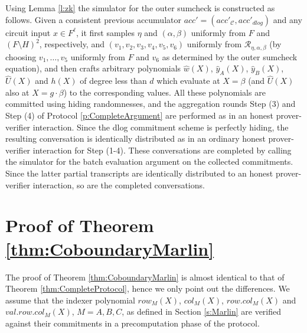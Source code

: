 \documentclass[10pt,article,oneside]{memoir}
\newtheorem{thm}{Theorem}[]
\theoremstyle{definition}
\theoremstyle{remark}
\begin{document}
\medskip
Using Lemma \ref{l:zk} the simulator for the outer sumcheck is constructed as follows.
Given a consistent previous accumulator $acc'=(acc'_{\mathcal C}, acc'_{dlog})$ and any circuit input $x\in F^\ell$, it first samples $\eta$ and $(\alpha,\beta)$ uniformly from $F$ and $(F\setminus H)^2$, respectively, and $(v_1, v_2, v_3,v_4,v_5,v_6)$ uniformly from $\mathcal R_{\eta,\alpha,\beta}$ (by choosing $v_1,\ldots, v_5$ uniformly from $F$ and $v_6$ as determined by the outer sumcheck equation), and then crafts arbitrary polynomials $\hat w(X)$, $\hat y_A(X)$, $\hat y_B(X)$, $\hat U(X)$ and $h(X)$ of degree less than $d$ which evaluate at $X=\beta$ (and $\hat U(X)$ also at $X=g\cdot\beta$) to the corresponding values.
All these polynomials are committed using hiding randomnesses, and the aggregation rounds Step (3) and Step (4) of Protocol \ref{p:CompleteArgument} are performed as in an honest prover-verifier interaction. 
Since the dlog commitment scheme is perfectly hiding, the resulting conversation is identically distributed as in an ordinary honest prover-verifier interaction for Step (1-4).
These conversations are completed by calling the simulator for the batch evaluation argument on the collected commitments.
Since the latter partial transcripts are identically distributed to an honest prover-verifier interaction, so are the completed conversations. 



\section{Proof of Theorem \ref{thm:CoboundaryMarlin}}
\label{s:ProofCoboundaryMarlin}

The proof of Theorem \ref{thm:CoboundaryMarlin} is almost identical to that of Theorem \ref{thm:CompleteProtocol}, hence we only point out the differences. 
We assume that the indexer polynomial $row_M(X)$, $col_M(X)$, $row.col_M(X)$ and $val.row.col_M(X)$, $M=A,B,C$, as defined in Section \ref{s:Marlin} are verified against their commitments in a precomputation phase of the protocol.
\end{document}
